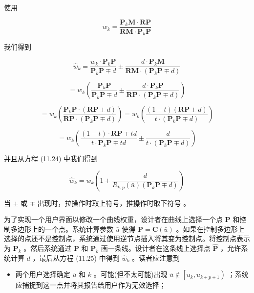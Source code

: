 \documentclass[../main.tex]{subfiles}
\begin{document}
使用

\[
{w}_{k} = \frac{{\mathbf{P}}_{k}\mathbf{M} \cdot  \mathbf{{RP}}}{\mathbf{{RM}} \cdot  {\mathbf{P}}_{k}\mathbf{P}}
\]

我们得到

\[
{\widehat{w}}_{k} = \frac{{w}_{k} \cdot  {\mathbf{P}}_{k}\mathbf{P}}{{\mathbf{P}}_{k}\mathbf{P} \mp  d} \pm  \frac{d \cdot  {\mathbf{P}}_{k}\mathbf{M}}{\mathbf{{RM}} \cdot  \left( {{\mathbf{P}}_{k}\mathbf{P} \mp  d}\right) }
\]

\[
= {w}_{k}\left( {\frac{{\mathbf{P}}_{k}\mathbf{P}}{{\mathbf{P}}_{k}\mathbf{P} \mp  d} \pm  \frac{d \cdot  {\mathbf{P}}_{k}\mathbf{P}}{\mathbf{{RP}} \cdot  \left( {{\mathbf{P}}_{k}\mathbf{P} \mp  d}\right) }}\right)
\]

\[
= {w}_{k}\left( \frac{{\mathbf{P}}_{k}\mathbf{P} \cdot  \left( {\mathbf{{RP}} \pm  d}\right) }{\mathbf{{RP}} \cdot  \left( {{\mathbf{P}}_{k}\mathbf{P} \mp  d}\right) }\right)  = {w}_{k}\left( \frac{\left( {1 - t}\right) \left( {\mathbf{{RP}} \pm  d}\right) }{t \cdot  \left( {{\mathbf{P}}_{k}\mathbf{P} \mp  d}\right) }\right)
\]

\[
= {w}_{k}\left( {\frac{\left( {1 - t}\right)  \cdot  \mathbf{{RP}} \mp  {td}}{t \cdot  {\mathbf{P}}_{k}\mathbf{P} \mp  {td}} \pm  \frac{d}{t \cdot  \left( {{\mathbf{P}}_{k}\mathbf{P} \mp  d}\right) }}\right)
\]

并且从方程 (11.24) 中我们得到

\[
{\widehat{w}}_{k} = {w}_{k}\left( {1 \pm  \frac{d}{{R}_{k,p}\left( \bar{u}\right) \left( {{\mathbf{P}}_{k}\mathbf{P} \mp  d}\right) }}\right)  \tag{11.25}
\]

当 \(\pm\) 或 \(\mp\) 出现时，拉操作时取上符号，推操作时取下符号 \cite{Pieg89c}。

为了实现一个用户界面以修改一个曲线权重，设计者在曲线上选择一个点 \(\mathbf{P}\) 和控制多边形上的一个点。系统计算参数 \(\bar{u}\) 使得 \(\mathbf{P} = \mathbf{C}\left( \bar{u}\right)\) 。如果在控制多边形上选择的点还不是控制点，系统通过使用逆节点插入将其变为控制点。将控制点表示为 \({\mathbf{P}}_{k}\) 。然后系统通过 \(\mathbf{P}\) 和 \({\mathbf{P}}_{k}\) 画一条线。设计者在这条线上选择点 \(\widehat{\mathbf{P}}\) ，允许系统计算 \(d\) ，最后从方程 (11.25) 中得到 \({\widehat{w}}_{k}\) 。读者应注意到

\begin{itemize}
\item 两个用户选择确定 \(\bar{u}\) 和 \(k\) 。可能(但不太可能)出现 \(\bar{u} \notin  \left\lbrack  {{u}_{k},{u}_{k + p + 1}}\right)\) ；系统应捕捉到这一点并将其报告给用户作为无效选择；
\end{itemize}
\end{document}
